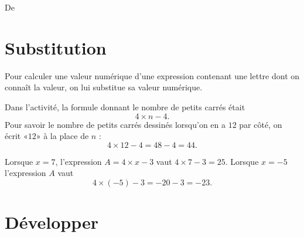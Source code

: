 

De \cite{NRHooXFvgpp4}

\section{Substitution}

\begin{Aretenir}
    Pour calculer une valeur numérique d'une expression contenant une lettre dont on connaît la valeur, on lui substitue sa valeur numérique.
\end{Aretenir}

\begin{example}
    Dans l'activité, la formule donnant le nombre de petits carrés était
    \begin{equation}
        4\times n-4.
    \end{equation}
    Pour savoir le nombre de petits carrés dessinés lorsqu'on en a \( 12\) par côté, on écrit «\( 12\)» à la place de \( n\) :
    \begin{equation}
        4\times 12-4=48-4=44.
    \end{equation}
\end{example}

\begin{example}
    Lorsque \( x=7\), l'expression \( A=4\times x-3\) vaut \( 4\times 7-3=25\). Lorsque \( x=-5\) l'expression \( A\) vaut
    \begin{equation}
        4\times (-5)-3=-20-3=-23.
    \end{equation}
\end{example}

\section{Développer}

